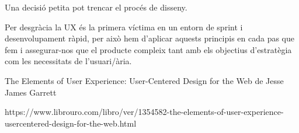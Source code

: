 \documentclass{article}
\begin{document}
Una decisió petita pot trencar el procés de disseny.

Per desgràcia la UX és la primera víctima en un entorn de sprint i desenvolupament ràpid, per això hem d'aplicar aquests principis en cada pas que fem i assegurar-nos que el producte compleix tant amb els objectius d’estratègia com les necessitats de l'usuari/ària.



\begin{thebibliography}{9}

The Elements of User Experience: User-Centered Design for the Web de Jesse James Garrett

https://www.librouro.com/libro/ver/1354582-the-elements-of-user-experience-usercentered-design-for-the-web.html

\end{thebibliography}
\end{document}
